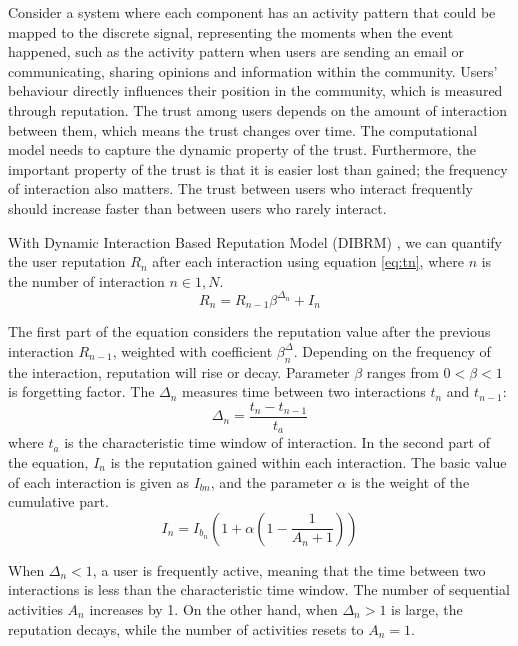 Consider a system where each component has an activity pattern that could be mapped to the discrete signal, representing the moments when the event happened, such as the activity pattern when users are sending an email or communicating, sharing opinions and information within the community. Users' behaviour directly influences their position in the community, which is measured through reputation. The trust among users depends on the amount of interaction between them, which means the trust changes over time. The computational model needs to capture the dynamic property of the trust. Furthermore, the important property of the trust is that it is easier lost than gained; the frequency of interaction also matters. The trust between users who interact frequently should increase faster than between users who rarely interact. 

With Dynamic Interaction Based Reputation Model (DIBRM) \cite{melnikov2018toward}, we can quantify the user reputation $R_n$ after each interaction using equation \ref{eq:tn}, where $n$ is the number of interaction $n\in{1, N}$.
\begin{equation}\label{eq:tn}
R_{n}=R_{n-1} \beta^{\Delta_{n}} + I_{n}
\end{equation}

The first part of the equation considers the reputation value after the previous interaction $R_{n-1}$, weighted with coefficient $\beta^\Delta_{n}$. Depending on the frequency of the interaction, reputation will rise or decay. Parameter $\beta$ ranges from $0<\beta < 1$ is forgetting factor. The $\Delta_n$ measures time between two interactions $t_n$ and $t_{n-1}$: 
\begin{equation}\label{eq:deltan}
\Delta_{n}=\frac{t_{n}-t_{n-1}}{t_{a}}
\end{equation}
where $t_a$ is the characteristic time window of interaction. In the second part of the equation, $I_n$ is the reputation gained within each interaction. The basic value of each interaction is given as $I_{bn}$, and the parameter $\alpha$ is the weight of the cumulative part. 
\begin{equation}\label{eq:ibn}
I_n  = I_{b_{n}}(1 +  \alpha  (1-\frac{1}{A_n+1}))
\end{equation}

When $\Delta_{n}<1$, a user is frequently active, meaning that the time between two interactions is less than the characteristic time window. The number of sequential activities $A_n$ increases by 1. On the other hand, when $\Delta_n>1$ is large, the reputation decays, while the number of activities resets to $A_n=1$. 

